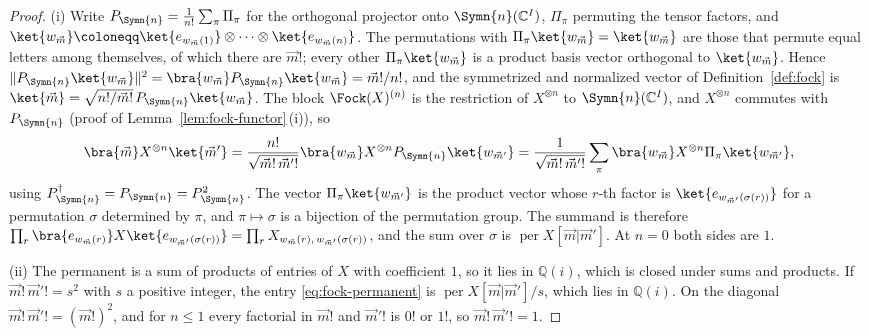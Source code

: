 \begin{proof}
(i) Write $P_{\Symn{n}}=\frac{1}{n!}\sum_\pi\Pi_\pi$ for the orthogonal
projector onto $\Symn{n}(\mathbb{C}^{I})$, $\Pi_\pi$ permuting the tensor
factors, and $\ket{w_{\vec m}}\coloneqq\ket{e_{w_{\vec m}(1)}}\otimes\cdots
\otimes\ket{e_{w_{\vec m}(n)}}$. The permutations with
$\Pi_\pi\ket{w_{\vec m}}=\ket{w_{\vec m}}$ are those that permute equal
letters among themselves, of which there are $\vec m!$; every other
$\Pi_\pi\ket{w_{\vec m}}$ is a product basis vector orthogonal to
$\ket{w_{\vec m}}$. Hence
$\lVert P_{\Symn{n}}\ket{w_{\vec m}}\rVert^2
=\bra{w_{\vec m}}P_{\Symn{n}}\ket{w_{\vec m}}=\vec m!/n!$, and the
symmetrized and normalized vector of Definition~\ref{def:fock} is
$\ket{\vec m}=\sqrt{n!/\vec m!}\,P_{\Symn{n}}\ket{w_{\vec m}}$. The block
$\Fock(X)^{(n)}$ is the restriction of $X^{\otimes n}$ to
$\Symn{n}(\mathbb{C}^{I})$, and $X^{\otimes n}$ commutes with
$P_{\Symn{n}}$ (proof of Lemma~\ref{lem:fock-functor}\,(i)), so
\begin{equation*}
  \bra{\vec m}X^{\otimes n}\ket{\vec m'}
  =\frac{n!}{\sqrt{\vec m!\,\vec m'!}}
   \bra{w_{\vec m}}X^{\otimes n}P_{\Symn{n}}\ket{w_{\vec m'}}
  =\frac{1}{\sqrt{\vec m!\,\vec m'!}}\sum_\pi
   \bra{w_{\vec m}}X^{\otimes n}\Pi_\pi\ket{w_{\vec m'}} ,
\end{equation*}
using $P_{\Symn{n}}^{\dagger}=P_{\Symn{n}}=P_{\Symn{n}}^{2}$. The vector
$\Pi_\pi\ket{w_{\vec m'}}$ is the product vector whose $r$-th factor is
$\ket{e_{w_{\vec m'}(\sigma(r))}}$ for a permutation $\sigma$ determined by
$\pi$, and $\pi\mapsto\sigma$ is a bijection of the permutation group. The
summand is therefore $\prod_r\bra{e_{w_{\vec m}(r)}}X\ket{e_{w_{\vec m'}(\sigma(r))}}
=\prod_rX_{w_{\vec m}(r),\,w_{\vec m'}(\sigma(r))}$, and the sum over
$\sigma$ is $\operatorname{per}X[\vec m|\vec m']$. At $n=0$ both sides are
$1$.

(ii) The permanent is a sum of products of entries of $X$ with coefficient
$1$, so it lies in $\mathbb{Q}(i)$, which is closed under sums and products.
If $\vec m!\,\vec m'!=s^{2}$ with $s$ a positive integer, the entry
\eqref{eq:fock-permanent} is $\operatorname{per}X[\vec m|\vec m']/s$, which
lies in $\mathbb{Q}(i)$. On the diagonal $\vec m!\,\vec m'!=(\vec m!)^{2}$,
and for $n\le1$ every factorial in $\vec m!$ and $\vec m'!$ is $0!$ or $1!$,
so $\vec m!\,\vec m'!=1$.
\end{proof}
